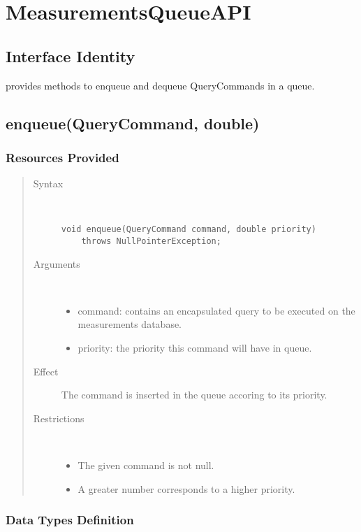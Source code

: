 \section{MeasurementsQueueAPI}

\subsection{Interface Identity}

\npar {} provides methods to enqueue and dequeue
QueryCommands in a queue.

\subsection{enqueue(QueryCommand, double)}

\subsubsection{Resources Provided}

\begin{quote}
	\begin{description}
		\item[Syntax] \ 
		\begin{verbatim}
void enqueue(QueryCommand command, double priority) 
    throws NullPointerException;
		\end{verbatim}
		\item[Arguments] \
		\begin{itemize}
			\item command: contains an encapsulated query to be executed on the
			measurements database.
			\item priority: the priority this command will have in queue. 
		\end{itemize}
		\item[Effect] The command is inserted in the queue accoring to its priority.
		\item[Restrictions] \ 
		\begin{itemize}
			\item The given command is not null.
			\item A greater number corresponds to a higher priority. 
		\end{itemize}
	\end{description} 
\end{quote}

\subsubsection{Data Types Definition}

